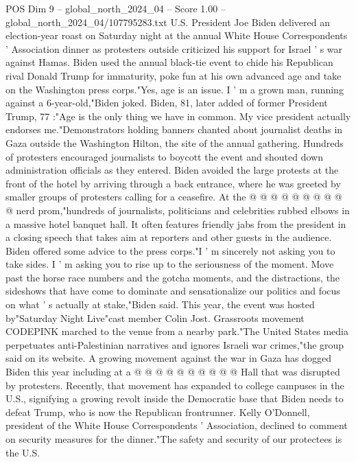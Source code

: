 \begin{textsample}{POS Dim 9 – global\_north\_2024\_04 – Score 1.00 – global\_north\_2024\_04/107795283.txt}  \label{ex:f9_pos_184}
U.S.
President Joe Biden delivered an election-year roast on Saturday night at the annual White House Correspondents ' Association dinner as protesters outside criticized his support for Israel ' s war against Hamas.
Biden used the annual black-tie event to chide his Republican rival Donald Trump for immaturity, poke fun at his own advanced age and take on the Washington press corps."Yes, age is an issue.
I ' m a grown man, running against a 6-year-old,"Biden joked.
Biden, 81, later added of former President Trump, 77 :"Age is the only thing we have in common.
My vice president actually endorses me."Demonstrators holding banners chanted about journalist deaths in Gaza outside the Washington Hilton, the site of the annual gathering.
Hundreds of protesters encouraged journalists to boycott the event and shouted down administration officials as they entered.
Biden avoided the large protests at the front of the hotel by arriving through a back entrance, where he was greeted by smaller groups of protesters calling for a ceasefire.
At the @ @ @ @ @ @ @ @ @ @ nerd prom,"hundreds of journalists, politicians and celebrities rubbed elbows in a massive hotel banquet hall.
It often features friendly jabs from the president in a closing speech that takes aim at reporters and other guests in the audience.
Biden offered some advice to the press corps."I ' m sincerely not asking you to take sides.
I ' m asking you to rise up to the seriousness of the moment.
Move past the horse race numbers and the gotcha moments, and the distractions, the sideshows that have come to dominate and sensationalize our politics and focus on what ' s actually at stake,"Biden said.
This year, the event was hosted by"Saturday Night Live"cast member Colin Jost.
Grassroots movement CODEPINK marched to the venue from a nearby park."The United States media perpetuates anti-Palestinian narratives and ignores Israeli war crimes,"the group said on its website.
A growing movement against the war in Gaza has dogged Biden this year including at a @ @ @ @ @ @ @ @ @ @ Hall that was disrupted by protesters.
Recently, that movement has expanded to college campuses in the U.S., signifying a growing revolt inside the Democratic base that Biden needs to defeat Trump, who is now the Republican frontrunner.
Kelly O'Donnell, president of the White House Correspondents ' Association, declined to comment on security measures for the dinner."The safety and security of our protectees is the U.S.

\end{textsample}
